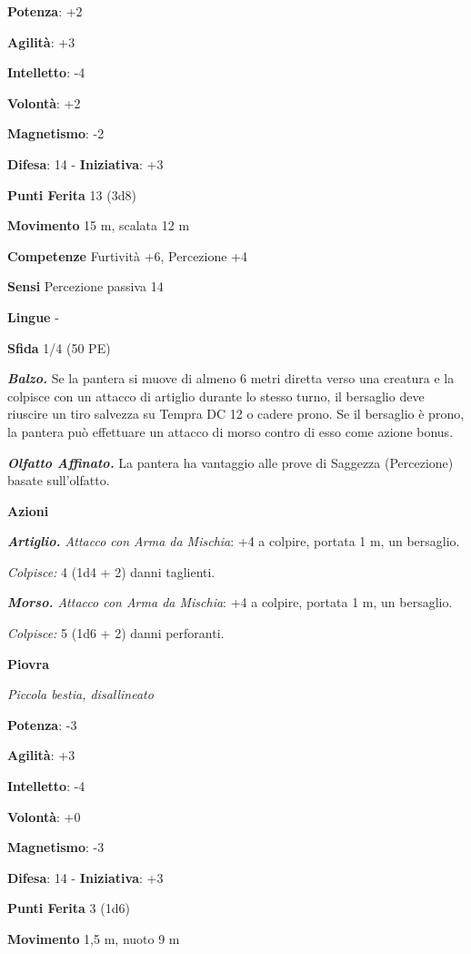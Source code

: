 \begin{multicols}{2}
\textbf{Potenza}: +2

\textbf{Agilità}: +3

\textbf{Intelletto}: -4

\textbf{Volontà}: +2

\textbf{Magnetismo}: -2

\textbf{Difesa}: 14 - \textbf{Iniziativa}: +3

\textbf{Punti Ferita} 13 (3d8)

\textbf{Movimento} 15 m, scalata 12 m

\textbf{Competenze} Furtività +6, Percezione +4

\textbf{Sensi} Percezione passiva 14

\textbf{Lingue} -

\textbf{Sfida} 1/4 (50 PE)\smallskip

\emph{\textbf{Balzo.}} Se la pantera si muove di almeno 6 metri diretta
verso una creatura e la colpisce con un attacco di artiglio durante lo
stesso turno, il bersaglio deve riuscire un tiro salvezza su Tempra DC 12
o cadere prono. Se il bersaglio è prono, la pantera può effettuare un
attacco di morso contro di esso come azione bonus.

\emph{\textbf{Olfatto Affinato.}} La pantera ha vantaggio alle prove di
Saggezza (Percezione) basate sull'olfatto.

\smallskip\textbf{Azioni}

\emph{\textbf{Artiglio.} Attacco con Arma da Mischia}: +4 a colpire,
portata 1 m, un bersaglio.

\emph{Colpisce:} 4 (1d4 + 2) danni taglienti.

\emph{\textbf{Morso.} Attacco con Arma da Mischia}: +4 a colpire,
portata 1 m, un bersaglio.

\emph{Colpisce:} 5 (1d6 + 2) danni perforanti.



\textbf{Piovra}

\emph{Piccola bestia, disallineato}

\textbf{Potenza}: -3

\textbf{Agilità}: +3

\textbf{Intelletto}: -4

\textbf{Volontà}: +0

\textbf{Magnetismo}: -3

\textbf{Difesa}: 14 - \textbf{Iniziativa}: +3

\textbf{Punti Ferita} 3 (1d6)

\textbf{Movimento} 1,5 m, nuoto 9 m


\end{multicols}
